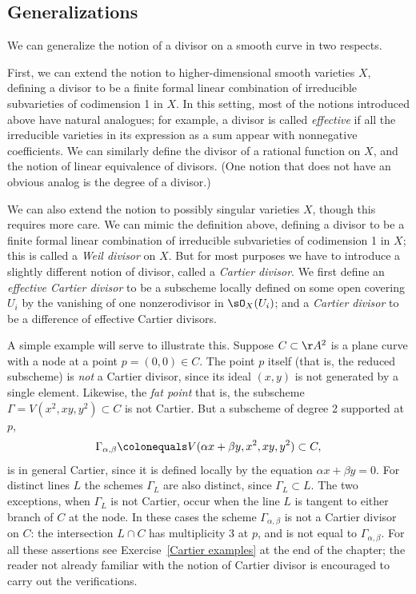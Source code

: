 \subsection*{Generalizations}

We can generalize the notion of a divisor on a smooth curve in two respects.

First, we can extend the notion to higher-dimensional smooth varieties
$X$, defining a divisor to be a finite formal linear combination of
irreducible subvarieties of codimension 1 in $X$. In this setting,
most of the notions introduced above have natural analogues; for
%
example, a divisor is called \emph{effective} if all the irreducible
varieties in its expression as a sum appear with nonnegative
coefficients. We can similarly define the divisor of a rational
function on $X$, and the notion of linear equivalence of divisors.
(One notion that does not have an obvious analog is the degree of a divisor.)

We can also extend the notion to possibly singular varieties $X$,
though this requires more care. We can mimic the definition above,
defining a divisor to be a finite formal linear combination of
irreducible subvarieties of codimension 1 in $X$; this is called a
%
\emph{Weil divisor} on $X$. But for most purposes we have to introduce
a slightly different notion of divisor, called a \emph{Cartier
  divisor}. We first define an \emph{effective Cartier divisor} to be
%
a subscheme locally defined on some open covering $U_{i}$ by the
vanishing of one nonzerodivisor in $\sO_{X}(U_{i})$; and a
\emph{Cartier divisor} to be a difference of effective Cartier divisors.

A simple example will serve to illustrate this. Suppose $C \subset
\AA^2$ is a plane curve with a node at a point $p = (0,0) \in C$. The
point $p$ itself (that is, the reduced subscheme) is \emph{not} a
Cartier divisor, since its ideal $(x,y)$ is not generated by a single
element. Likewise, the
%
\emph{fat point}
\emdash that is, the subscheme $\Gamma = V(x^2, xy, y^2) \subset C$
\emdash is not Cartier. But a subscheme of degree 2 supported at $p$,
$$
\Gamma_{\alpha, \beta} \colonequals V(\alpha x + \beta y, x^2, xy, y^2) \subset C,
$$
\emdash
is in general Cartier,
since
it is defined locally by the equation $\alpha x + \beta y = 0$.
For distinct lines $L$ the schemes $\Gamma_{L}$ are also distinct,
since $\Gamma_{L}\subset L$. The two exceptions, when $\Gamma_{L}$ is
not Cartier, occur when the line $L$ is tangent to either branch of
$C$ at the node.
In these cases the scheme $\Gamma_{\alpha, \beta}$ is not a Cartier
divisor on $C$: the intersection $L \cap C$ has multiplicity 3 at $p$,
and is not equal to $\Gamma_{\alpha, \beta}$.
For all these assertions see
Exercise~\ref{Cartier examples}
at the end of the chapter;
the reader
not already familiar with the notion of Cartier divisor is
encouraged to carry out the verifications.

